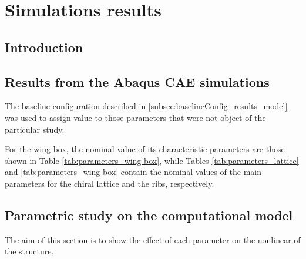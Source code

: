 \chapter{Simulations results} \label{chap:Results_sim}

\section{Introduction} \label{sec:intro_Results_sim}


\section{Results from the Abaqus CAE simulations} \label{sec:computationalParametricStudy_Results}

The baseline configuration described in \ref{subsec:baselineConfig_results_model} was used to assign value to those parameters that were not object of the particular study.

For the wing-box, the nominal value of its characteristic parameters are those shown in Table \ref{tab:parameters_wing-box}, while Tables \ref{tab:parameters_lattice} and \ref{tab:parameters_wing-box} contain the nominal values of the main parameters for the chiral lattice and the ribs, respectively.

\section{Parametric study on the computational model} \label{sec:computationalParametricStudy_Results_sim}
%
The aim of this section is to show the effect of each parameter on the nonlinear of the structure.

